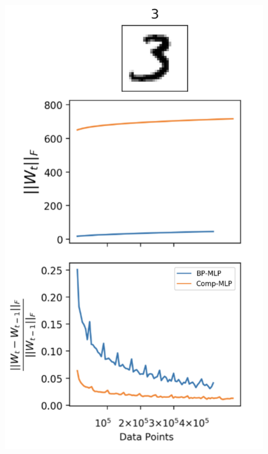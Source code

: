 \documentclass[dvipsnames, usenames]{beamer}
\begin{document}
\begin{frame}
	\begin{figure}
		\centering
		\includegraphics[height=\textheight]{../figures/report/p2_1}
	\end{figure}
\end{frame}

\end{document}
